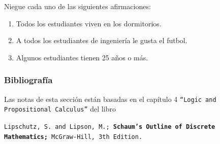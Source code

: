 \documentclass[xcolor={svgnames},
  hyperref={colorlinks}, 
  spanish, 12pt]{beamer}
\numberwithin{equation}{section} %
\numberwithin{figure}{section} %
\begin{document}
\begin{frame}
	\begin{evc}
	Niegue cada uno de las siguientes afirmaciones:
	\begin{enumerate}
		\item Todos los estudiantes viven en los dormitorios.
		\item A todos los estudiantes de ingeniería le gusta el futbol.
		\item Algunos estudiantes tienen 25 años o más.
	\end{enumerate}
	\end{evc}
\end{frame}

\begin{frame}
 \frametitle{Bibliograf\'ia}
 Las notas de esta secci\'on est\'an basadas en el cap\'itulo 4 \texttt{``Logic and Propositional Calculus''} del libro
 \begin{center}
  \texttt{Lipschutz, S. and Lipson, M.;\textbf{ Schaum's Outline of Discrete Mathematics;} McGraw-Hill, 3th Edition.}
 \end{center}

\end{frame}
\end{document}

